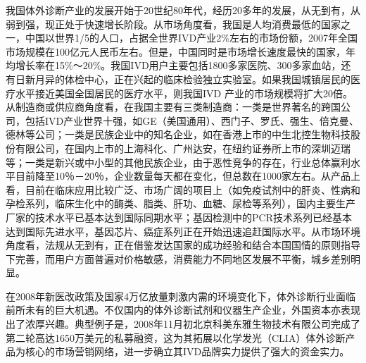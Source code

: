 我国体外诊断产业的发展开始于20世纪80年代，经历20多年的发展，从无到有，从弱到强，现正处于快速增长阶段。从市场角度看，我国是人均消费最低的国家之一，中国以世界1/5的人口，占据全世界IVD产业2\%左右的市场份额，2007年全国市场规模在100亿元人民币左右。但是，中国同时是市场增长速度最快的国家，年均增长率在15\%～20\%。我国IVD用户主要包括1800多家医院、300多家血站，还有日新月异的体检中心，正在兴起的临床检验独立实验室。如果我国城镇居民的医疗水平接近美国全国居民的医疗水平，则我国IVD
产业的市场规模将扩大20倍。从制造商或供应商角度看，在我国主要有三类制造商：一类是世界著名的跨国公司，包括IVD产业世界十强，如GE（美国通用）、西门子、罗氏、强生、倍克曼、德林等公司；一类是民族企业中的知名企业，如在香港上市的中生北控生物科技股份有限公司，在国内上市的上海科化、广州达安，在纽约证券所上市的深圳迈瑞等；一类是新兴或中小型的其他民族企业，由于恶性竞争的存在，行业总体赢利水平目前降至10％－20％，企业数量每天都在变化，但总数在1000家左右。从产品上看，目前在临床应用比较广泛、市场广阔的项目上（如免疫试剂中的肝炎、性病和孕检系列，临床生化中的酶类、脂类、肝功、血糖、尿检等系列），国内主要生产厂家的技术水平已基本达到国际同期水平；基因检测中的PCR技术系列已经基本达到国际先进水平，基因芯片、癌症系列正在开始迅速追赶国际水平。从市场环境角度看，法规从无到有，正在借鉴发达国家的成功经验和结合本国国情的原则指导下完善，而用户方面普遍对价格敏感，消费能力不同地区发展不平衡，城乡差别明显。

在2008年新医改政策及国家4万亿放量刺激内需的环境变化下，体外诊断行业面临前所未有的巨大机遇。不仅国内的体外诊断试剂和仪器生产企业，外国资本亦表现出了浓厚兴趣。典型例子是，2008年11月初北京科美东雅生物技术有限公司完成了第二轮高达1650万美元的私募融资，这为其拓展以化学发光（CLIA）体外诊断产品为核心的市场营销网络，进一步确立其IVD品牌实力提供了强大的资金实力。

